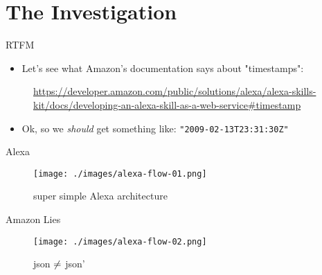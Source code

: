 \documentclass[10pt]{beamer}
\begin{document}
\section{The Investigation}
\begin{frame}{RTFM}
		\begin{itemize}
			\item Let's see what Amazon's documentation says about "timestamps":
		\end{itemize}
			\begin{figure}
				\centering
				\caption{\url{https://developer.amazon.com/public/solutions/alexa/alexa-skills-kit/docs/developing-an-alexa-skill-as-a-web-service\#timestamp}}
			\end{figure}
		\begin{itemize}
			\item Ok, so we \textit{should} get something like: \texttt{"2009-02-13T23:31:30Z"}
	\end{itemize}
\end{frame}

\begin{frame}{Alexa}
\begin{center}
	\begin{figure}
		\centering
		\texttt{[image: ./images/alexa-flow-01.png]}
		\caption{super simple Alexa architecture}
	\end{figure}
\end{center}
\end{frame}

\begin{frame}{Amazon Lies}
\begin{center}
	\begin{figure}
		\centering
		\texttt{[image: ./images/alexa-flow-02.png]}
		\caption{json $\protect\neq$ json'}
	\end{figure}
\end{center}
\end{frame}
\end{document}
